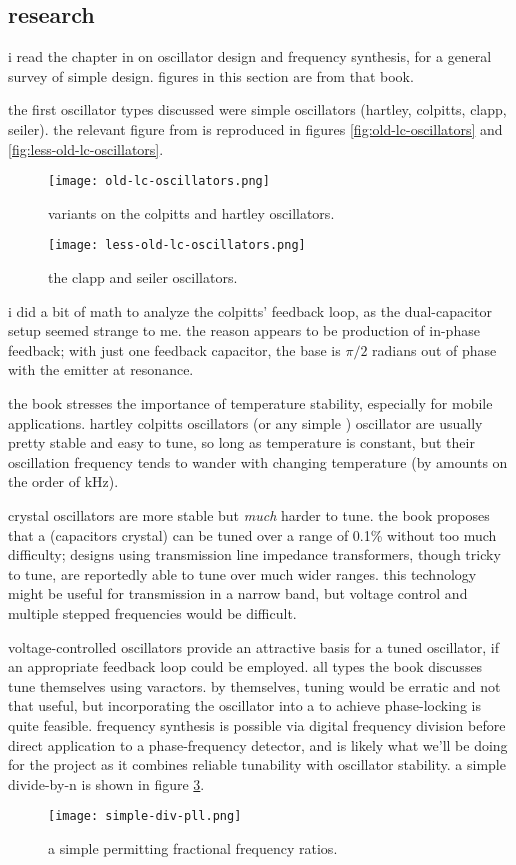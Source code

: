 \subsection*{research}
i read the chapter in \autocite{experimental-rf} on oscillator design and
frequency synthesis, for a general survey of simple \vco design. figures in
this section are from that book.

the first oscillator types discussed were simple \lc oscillators (hartley,
colpitts, clapp, seiler). the relevant figure from \autocite{experimental-rf}
is reproduced in figures \ref{fig:old-lc-oscillators} and
\ref{fig:less-old-lc-oscillators}.

\begin{figure}[H]
	\centering
	\texttt{[image: old-lc-oscillators.png]}
	\caption{variants on the colpitts and hartley oscillators.}
	\label{fig:lc-oscillators}
\end{figure}

\begin{figure}[H]
	\centering
	\texttt{[image: less-old-lc-oscillators.png]}
	\caption{the clapp and seiler oscillators.}
	\label{fig:lc-oscillators}
\end{figure}

i did a bit of math to analyze the colpitts' feedback loop, as the
dual-capacitor setup seemed strange to me. the reason appears to be production
of in-phase feedback; with just one feedback capacitor, the base is \(\pi/2\)
radians out of phase with the emitter at resonance.

the book stresses the importance of temperature stability, especially for
mobile applications. hartley \amp colpitts oscillators (or any simple \lc)
oscillator are usually pretty stable and easy to tune, so long as temperature
is constant, but their oscillation frequency tends to wander with changing
temperature (by amounts on the order of kHz).

crystal oscillators are more stable but \emph{much} harder to tune. the book
proposes that a \vxo (capacitors \amp crystal) can be tuned over a range of
0.1\% without too much difficulty; designs using transmission line impedance
transformers, though tricky to tune, are reportedly able to tune over much
wider ranges. this technology might be useful for \fm transmission in a narrow
band, but voltage control and multiple stepped frequencies would be difficult.

voltage-controlled \lc oscillators provide an attractive basis for a tuned
oscillator, if an appropriate feedback loop could be employed. all types the
book discusses tune themselves using varactors. by themselves, tuning would be
erratic and not that useful, but incorporating the oscillator into a \pll to
achieve phase-locking is quite feasible. frequency synthesis is possible via
digital frequency division before direct application to a phase-frequency
detector, and is likely what we'll be doing for the project as it combines
reliable tunability with oscillator stability. a simple divide-by-n \pll is
shown in figure \ref{fig:simple-div-pll}.

\begin{figure}[H]
	\centering
	\texttt{[image: simple-div-pll.png]}
	\caption{a simple \pll permitting fractional frequency ratios.}
	\label{fig:simple-div-pll}
\end{figure}
